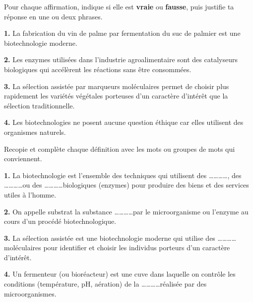 \documentclass[11pt]{article}
\newcommand{\cle}[1]{{\popxbold\color{popdark}#1}}
\begin{document}
\begin{exercice}
Pour chaque affirmation, indique si elle est \textbf{vraie} ou \textbf{fausse}, puis justifie ta réponse en une ou deux phrases.

\textbf{1.} La fabrication du vin de palme par fermentation du suc de palmier est une biotechnologie moderne.

\textbf{2.} Les enzymes utilisées dans l'industrie agroalimentaire sont des catalyseurs biologiques qui accélèrent les réactions sans être consommées.

\textbf{3.} La sélection assistée par marqueurs moléculaires permet de choisir plus rapidement les variétés végétales porteuses d'un caractère d'intérêt que la sélection traditionnelle.

\textbf{4.} Les biotechnologies ne posent aucune question éthique car elles utilisent des organismes naturels.
\end{exercice}

\begin{exercice}
Recopie et complète chaque définition avec les mots ou groupes de mots qui conviennent.

\textbf{1.} La \cle{biotechnologie} est l'ensemble des techniques qui utilisent des \dots\dots\dots\dots, des \dots\dots\dots\dots ou des \dots\dots\dots\dots biologiques (enzymes) pour produire des biens et des services utiles à l'homme.

\textbf{2.} On appelle \cle{substrat} la substance \dots\dots\dots\dots par le microorganisme ou l'enzyme au cours d'un procédé biotechnologique.

\textbf{3.} La \cle{sélection assistée} est une biotechnologie moderne qui utilise des \dots\dots\dots\dots moléculaires pour identifier et choisir les individus porteurs d'un caractère d'intérêt.

\textbf{4.} Un \cle{fermenteur} (ou bioréacteur) est une cuve dans laquelle on contrôle les conditions (température, pH, aération) de la \dots\dots\dots\dots réalisée par des microorganismes.
\end{exercice}
\end{document}
